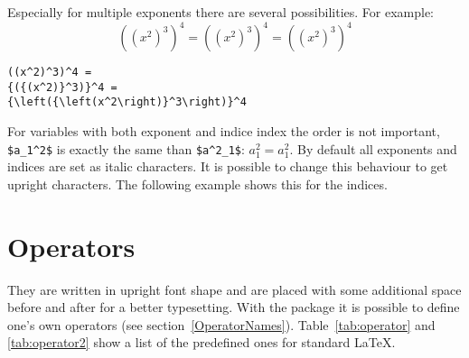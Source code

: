 \begin{table}[htb]
Especially for multiple exponents 
there are several possibilities. For example:
\begin{equation}
((x^2)^3)^4 = {({(x^2)}^3)}^4 = {\left({\left(x^2\right)}^3\right)}^4
\end{equation}

\begin{lstlisting}
((x^2)^3)^4 =
{({(x^2)}^3)}^4 =
{\left({\left(x^2\right)}^3\right)}^4
\end{lstlisting}

For variables with both exponent and indice index 
the order is not important, \verb|$a_1^2$| is
exactly the same than \verb|$a^2_1$|: $a_1^2=a^2_1$. By default all exponents and indices
are set as italic characters. It is possible to change this behaviour 
to get upright characters. The following example shows this for the indices.

\bgroup
{}
\egroup

\section{Operators}\label{sec:ltxOperators}

They are written in upright font shape and are placed with some additional
space before and after for a better typesetting. With the \AmSmath
package it is possible to define one's own operators (see
section~\vref{OperatorNames}). Table~\vref{tab:operator} and \vref{tab:operator2} show a list of
the predefined ones for standard \LaTeX{}.


\end{table}
